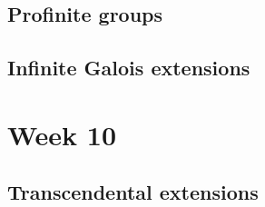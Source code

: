 \documentclass[12pt]{report}
\theoremstyle{definition}
\begin{document}
\section{Profinite groups}

\section{Infinite Galois extensions}


\chapter*{Week 10}
\setcounter{chapter}{10}

\section{Transcendental extensions}




\end{document}
